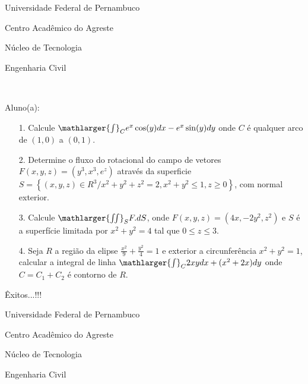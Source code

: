 \documentclass[oneside,a4paper,12pt]{article}
\newcommand{\universidade}{Universidade Federal de Pernambuco}
\newcommand{\centro}{Centro Acadêmico do Agreste}
\newcommand{\departamento}{Núcleo de Tecnologia}
\newcommand{\curso}{Engenharia Civil}
\begin{document}
	\pagestyle{empty}
	
	\begin{center}
	 	\vspace{0pt}
	 	
		\universidade
		\par
		\centro
		\par
		\departamento
		\par
		\curso
		\par
		\vspace{08pt}
		\\
	\end{center}
	
	
	\begin{flushleft}
		Aluno(a):
	\end{flushleft}
	
\begin{itemize}
\item[1.] Calcule $\mathlarger{\int}_{C}e^{x}\cos(y)dx-e^{x}\sin(y)dy$ onde $C$ é qualquer arco de $(1,0)$ a $(0,1)$.
\end{itemize}
\begin{itemize}
\item[2.] Determine o fluxo do rotacional do campo de vetores $F(x,y,z)=(y^{3},x^{3},e^{z})$ através da superficie $S=\left\lbrace (x,y,z)\in R^{3} / x^{2}+y^{2}+z^{2}=2, x^{2}+y^{2}\leq 1, z\geq 0 \right\rbrace $, com normal exterior. 
 \end{itemize}
 \begin{itemize}
\item [3.] Calcule $\mathlarger{\iint}_{S}F.dS$, onde $F(x,y,z)=(4x,-2y^{2},z^{2})$ e $S$ é a superfície limitada por $x^{2}+y^{2}=4$ tal que $0\leq z \leq3$.
\end{itemize}
\begin{itemize}
\item[4.] Seja $R$ a região da elipse $\frac{x^{2}}{9}+\frac{y^{2}}{4}=1$ e exterior a circunferência $x^{2}+y^{2}=1$, calcular a integral de linha $\mathlarger{\int}_{C}2xydx+(x^{2}+2x)dy$ onde $C=C_{1}+C_{2}$ é contorno de $R$.
\end{itemize}

	\flushbottom
	\flushright
     Êxitos...!!!
     \begin{center}
     	\vspace{50pt}
     	
     	\universidade
     	\par
     	\centro
     	\par
     	\departamento
     	\par
     	\curso
     	\par
     	\vspace{08pt}
     	\\
     \end{center}
     
\end{document}
